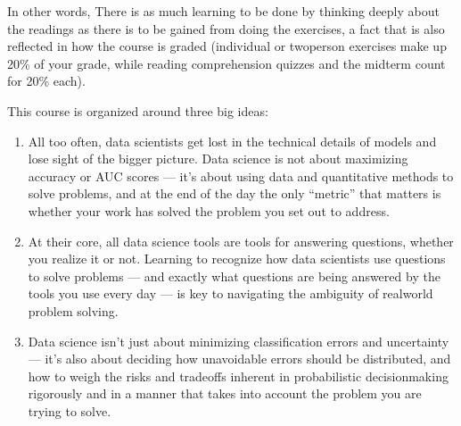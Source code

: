 \documentclass[letterpaper,10pt,english]{jupyterBook}
\begin{document}
\sphinxAtStartPar
In other words,  There is as much learning to be done by thinking deeply about the readings as there is to be gained from doing the exercises, a fact that is also reflected in how the course is graded (individual or two\sphinxhyphen{}person exercises make up 20\% of your grade, while reading comprehension quizzes and the midterm count for 20\% each).

\begin{DUlineblock}{0em}
\item[] 
\end{DUlineblock}

\sphinxAtStartPar
This course is organized around three big ideas:
\begin{enumerate}
%
\item {} 
\sphinxAtStartPar
{} All too often, data scientists get lost in the technical details of models and lose sight of the bigger picture. Data science is not about maximizing accuracy or AUC scores — it’s about using data and quantitative methods to solve problems, and at the end of the day the only “metric” that matters is whether your work has solved the problem you set out to address.

\item {} 
\sphinxAtStartPar
{} At their core, all data science tools are tools for answering questions, whether you realize it or not. Learning to recognize how data scientists use questions to solve problems — and exactly what questions are being answered by the tools you use every day — is key to navigating the ambiguity of real\sphinxhyphen{}world problem solving.

\item {} 
\sphinxAtStartPar
{} Data science isn’t just about minimizing classification errors and uncertainty — it’s also about deciding how unavoidable errors should be distributed, and how to weigh the risks and trade\sphinxhyphen{}offs inherent in probabilistic decision\sphinxhyphen{}making rigorously and in a manner that takes into account the problem you are trying to solve.

\end{enumerate}
\end{document}
